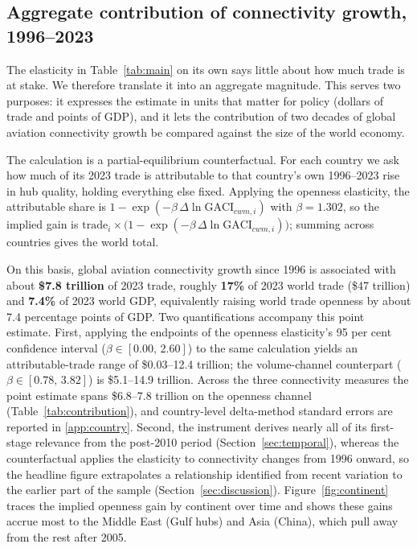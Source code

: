 \subsection{Aggregate contribution of connectivity growth, 1996--2023}
\label{sec:aggregate}
The elasticity in Table~\ref{tab:main} on its own says little about how much trade
is at stake. We therefore translate it into an aggregate magnitude. This serves
two purposes: it expresses the estimate in units that matter for policy (dollars
of trade and points of GDP), and it lets the contribution of two decades of global
aviation connectivity growth be compared against the size of the world economy.

The calculation is a partial-equilibrium counterfactual. For each country we ask
how much of its 2023 trade is attributable to that country's own 1996--2023 rise
in hub quality, holding everything else fixed. Applying the openness
elasticity, the attributable share is
$1-\exp(-\beta\,\Delta\ln\mathrm{GACI}_{cwm,i})$ with $\beta=1.302$, so the
implied gain is
$\text{trade}_i\times\bigl(1-\exp(-\beta\,\Delta\ln\mathrm{GACI}_{cwm,i})\bigr)$;
summing across countries gives the world total.

On this basis, global aviation connectivity growth since 1996 is associated with
about \textbf{\$7.8 trillion} of 2023 trade, roughly \textbf{17\%} of 2023 world
trade (\$47 trillion) and \textbf{7.4\%} of 2023 world GDP, equivalently raising
world trade openness by about 7.4 percentage points of GDP. Two
quantifications accompany this point estimate. First, applying the
endpoints of the openness elasticity's 95 per cent confidence interval
($\beta\in[0.00,\,2.60]$) to the same calculation yields an
attributable-trade range of \$0.03--12.4 trillion; the volume-channel
counterpart ($\beta\in[0.78,\,3.82]$) is \$5.1--14.9 trillion. Across the
three connectivity measures the point estimate spans \$6.8--7.8 trillion on
the openness channel (Table~\ref{tab:contribution}), and country-level
delta-method standard errors are reported in \ref{app:country}. Second, the
instrument derives
nearly all of its first-stage relevance from the post-2010 period
(Section~\ref{sec:temporal}), whereas the counterfactual applies the
elasticity to connectivity changes from 1996 onward, so the headline figure
extrapolates a relationship identified from recent variation to the earlier
part of the sample (Section~\ref{sec:discussion}). Figure~\ref{fig:continent}
traces the implied openness gain by continent over time and shows these gains
accrue most to the Middle East (Gulf hubs) and Asia (China), which pull away from
the rest after 2005.

